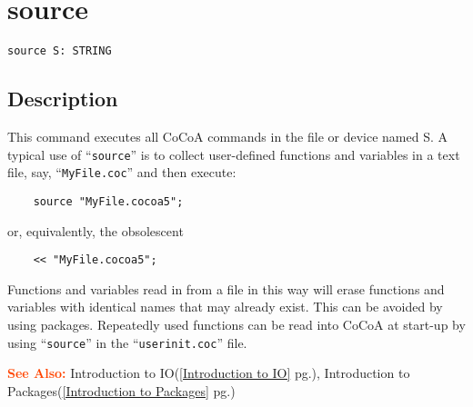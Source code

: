 \documentclass[a4paper]{mybook}
\newenvironment{command}{}{} %
\newcommand\SeeAlso{\par\textcolor{OrangeRed}{\textbf{\large See Also: }}}
\begin{document}
\section{source}
\label{source}
\begin{command} %


\begin{Verbatim}[label=syntax, rulecolor=\color{MidnightBlue},
frame=single]
source S: STRING
\end{Verbatim}


\subsection*{Description}

This command executes all CoCoA commands in the file or device named
S.  A typical use of ``\verb&source&'' is to collect user-defined functions and
variables in a text file, say, ``\verb&MyFile.coc&'' and then execute:
\begin{verbatim}
    source "MyFile.cocoa5";
\end{verbatim}
or, equivalently, the obsolescent
\begin{verbatim}
    << "MyFile.cocoa5";
\end{verbatim}
Functions and variables read in from a file in this way will erase
functions and variables with identical names that may already exist.
This can be avoided by using packages.  Repeatedly used functions can be
read into CoCoA at start-up by using ``\verb&source&'' in the
``\verb&userinit.coc&'' file.

\SeeAlso %
  Introduction to IO(\ref{Introduction to IO} pg.\pageref{Introduction to IO}), 
    Introduction to Packages(\ref{Introduction to Packages} pg.\pageref{Introduction to Packages})
\end{command} %
\end{document}
